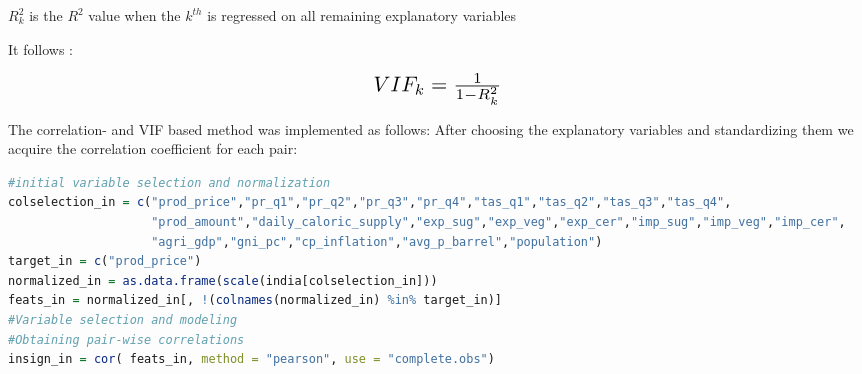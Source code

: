 \documentclass[11pt]{article}
\begin{document}
$R^2_{k}$ is the $R^2$ value when the $ k^{th}$ is regressed on all remaining explanatory variables

It follows : 
\begin{center}  \[ \scalebox{1.5} {$VIF_k  =\frac{1}{1-R^2_{k}}$}\] \end{center}

The correlation- and VIF based method was implemented as follows:
After choosing the explanatory variables and standardizing them we acquire the correlation coefficient for each pair:

\begin{lstlisting}[language= R, captionpos=b,caption=\href{https://github.com/jaidikam/sps_ws1718/tree/master/Qfolder3}{SPL\_Q3\_india\_impvar\_vif}]
#initial variable selection and normalization
colselection_in = c("prod_price","pr_q1","pr_q2","pr_q3","pr_q4","tas_q1","tas_q2","tas_q3","tas_q4",
                    "prod_amount","daily_caloric_supply","exp_sug","exp_veg","exp_cer","imp_sug","imp_veg","imp_cer", 
                    "agri_gdp","gni_pc","cp_inflation","avg_p_barrel","population") 
target_in = c("prod_price")
normalized_in = as.data.frame(scale(india[colselection_in]))
feats_in = normalized_in[, !(colnames(normalized_in) %in% target_in)]
#Variable selection and modeling
#Obtaining pair-wise correlations 
insign_in = cor( feats_in, method = "pearson", use = "complete.obs")
\end{lstlisting}
\end{document}
